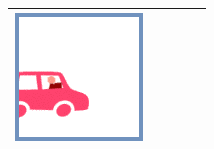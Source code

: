 \documentclass[12pt]{article}
\begin{document}
\begin{minipage}{\textwidth}
\begin{table}[H]
\begin{tabulary}{\linewidth}{|C|CCCC|}
				\vspace{0.01cm}\includegraphics[width=\linewidth]{option1}
				\\ \hline
			\end{tabulary}
		\end{table}
	\end{minipage} \\ \\
	
\end{document}
